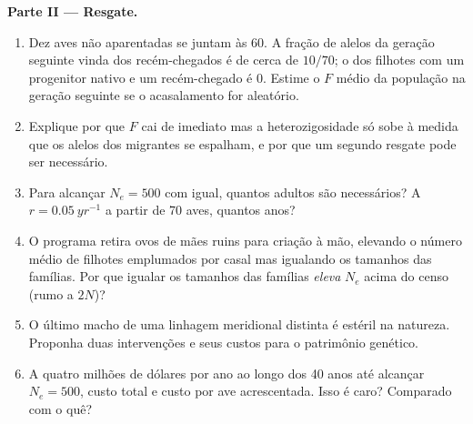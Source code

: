 \begin{problem}
\medskip
\noindent\textbf{Parte II --- Resgate.}
\begin{enumerate}[resume]
  \item Dez aves não aparentadas se juntam às 60. A fração de alelos da
        geração seguinte vinda dos recém-chegados é de cerca de $10/70$;
        o  dos filhotes com um progenitor nativo
        e um recém-chegado é $0$. Estime o $F$ médio da população na
        geração seguinte se o acasalamento for aleatório.
  \item Explique por que $F$ cai de imediato mas a heterozigosidade só
        sobe à medida que os alelos dos migrantes se espalham, e por que
        um segundo resgate pode ser necessário.
  \item Para alcançar $N_{e} = 500$ com  igual, quantos
        adultos são necessários? A $r = \qty{0.05}{yr^{-1}}$ a partir de
        70 aves, quantos anos?
  \item O programa retira ovos de mães ruins para criação à mão, elevando
        o número médio de filhotes emplumados por casal mas igualando os
        tamanhos das famílias. Por que igualar os tamanhos das famílias
        \emph{eleva} $N_{e}$ acima do censo (rumo a $2N$)?
  \item O último macho de uma linhagem meridional distinta é estéril na
        natureza. Proponha duas intervenções e seus custos para o
        patrimônio genético.
  \item A quatro milhões de dólares por ano ao longo dos 40 anos até
        alcançar $N_{e} = 500$, custo total e custo por ave acrescentada.
        Isso é caro? Comparado com o quê?
\end{enumerate}


\end{problem}
